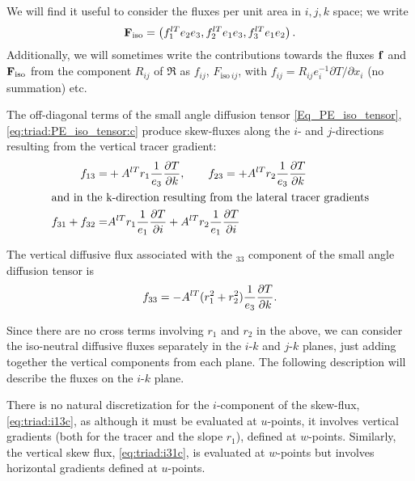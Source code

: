 \documentclass[NEMO_book]{subfiles}
\begin{document}
We will find it useful to consider the fluxes per unit area in $i,j,k$
space; we write
\begin{equation}
  \label{eq:triad:Fijk}
  \mathbf{F}_{\mathrm{iso}}=\left(f_1^{lT}e_2e_3, f_2^{lT}e_1e_3, f_3^{lT}e_1e_2\right).
\end{equation}
Additionally, we will sometimes write the contributions towards the
fluxes $\mathbf{f}$ and $\mathbf{F}_\mathrm{iso}$ from the component
$R_{ij}$ of $\Re$ as $f_{ij}$, $F_{\mathrm{iso}\: ij}$, with
$f_{ij}=R_{ij}e_i^{-1}\partial T/\partial x_i$ (no summation) etc.

The off-diagonal terms of the small angle diffusion tensor
\eqref{Eq_PE_iso_tensor}, \eqref{eq:triad:PE_iso_tensor:c} produce skew-fluxes along the
$i$- and $j$-directions resulting from the vertical tracer gradient:
\begin{align}
  \label{eq:triad:i13c}
  f_{13}=&+{A^{lT}} r_1\frac{1}{e_3}\frac{\partial T}{\partial k},\qquad f_{23}=+{A^{lT}} r_2\frac{1}{e_3}\frac{\partial T}{\partial k}\\
\intertext{and in the k-direction resulting from the lateral tracer gradients}
  \label{eq:triad:i31c}
 f_{31}+f_{32}=& {A^{lT}} r_1\frac{1}{e_1}\frac{\partial T}{\partial i}+{A^{lT}} r_2\frac{1}{e_1}\frac{\partial T}{\partial i}
\end{align}

The vertical diffusive flux associated with the $_{33}$
component of the small angle diffusion tensor is
\begin{equation}
  \label{eq:triad:i33c}
  f_{33}=-{A^{lT}}(r_1^2 +r_2^2) \frac{1}{e_3}\frac{\partial T}{\partial k}.
\end{equation}

Since there are no cross terms involving $r_1$ and $r_2$ in the above, we can
consider the iso-neutral diffusive fluxes separately in the $i$-$k$ and $j$-$k$
planes, just adding together the vertical components from each
plane. The following description will describe the fluxes on the $i$-$k$
plane.

There is no natural discretization for the $i$-component of the
skew-flux, \eqref{eq:triad:i13c}, as
although it must be evaluated at $u$-points, it involves vertical
gradients (both for the tracer and the slope $r_1$), defined at
$w$-points. Similarly, the vertical skew flux, \eqref{eq:triad:i31c}, is evaluated at
$w$-points but involves horizontal gradients defined at $u$-points.
\end{document}
